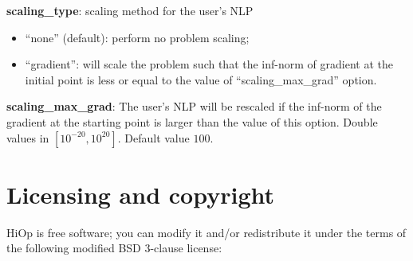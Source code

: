 \documentclass[11pt]{article}
\begin{document}

\noindent \textbf{scaling\_type}: scaling method for the user's NLP
\begin{itemize}
\item ``none'' (default): perform no problem scaling;
\item ``gradient'':  will scale the problem such that the inf-norm of gradient at the initial point is less or equal to the value of ``scaling\_max\_grad'' option.
\end{itemize}

\medskip

\noindent \textbf{scaling\_max\_grad}: The user's NLP will be rescaled if the inf-norm of the gradient at the starting point is larger than the value of this option. Double values in $[10^{-20}, 10^{20}]$. Default value $100$.


\medskip


%

\section{Licensing and copyright}
HiOp is free software; you can modify it and/or redistribute it under the terms of the following  modified BSD 3-clause license:
\end{document}
